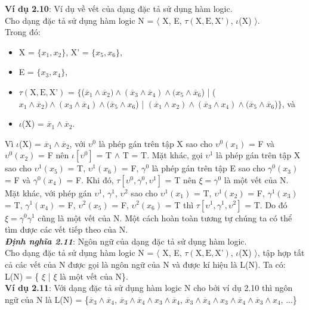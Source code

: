 \documentclass[a4paper,13pt,oneside,openany]{book}
\begin{document}
\begin{flushleft}
		\textbf{Ví dụ 2.10}: Ví dụ về vết của dạng đặc tả sử dụng hàm logic.\\
		Cho dạng đặc tả sử dụng hàm logic N = $\langle$ X, E, $\tau(\textrm{X}, \textrm{E}, \textrm{X'})$, $\iota$(X) $\rangle$.\\
		Trong đó:
		\begin{itemize}
			\item X = $\{x_1, x_2\}$, X' = $\{x_5, x_6\}$,
			\item E = $\{x_3, x_4\}$,
			\item $\tau(\textrm{X}, \textrm{E}, \textrm{X'})$ = $\{$($\overline{x}_1 \land \overline{x}_2) \land (\overline{x}_3 \land \overline{x}_4) \land (x_5 \land \overline{x}_6$) | ($x_1\land\overline{x}_2)\land (x_3\land \overline{x}_4)\land (\overline{x}_5 \land x_6$) | $(\overline{x}_1\land x_2)\land(\overline{x}_3\land x_4)\land (\overline{x}_5\land\overline{x}_6$)$\}$, và
			\item $\iota$(X) = $\overline{x}_1 \land \overline{x}_2$.
		\end{itemize}
		Vì $\iota$(X) = $\overline{x}_1 \land \overline{x}_2$, với $\upsilon^0$ là phép gán trên tập X sao cho $\upsilon^0(x_1)$ = F và $\upsilon^0(x_2)$ = F nên $\iota[\upsilon^0]$ = T $\land$ T = T. Mặt khác, gọi $\upsilon^1$ là phép gán trên tập X sao cho $\upsilon^1(x_5)$ = T, $\upsilon^1(x_6)$ = F, $\gamma^0$ là phép gán trên tập E sao cho $\gamma^0(x_3)$ = F và $\gamma^0(x_4)$ = F. Khi đó, $\tau[\upsilon^0, \gamma^0, \upsilon^1]$ = T nên $\xi = \gamma^0$ là một vết của N.
		Mặt khác, với phép gán $\upsilon^1$, $\gamma^1$,  $\upsilon^2$ sao cho $\upsilon^1(x_1)$ = T, $\upsilon^1(x_2)$ = F, $\gamma^1(x_3)$ = T, $\gamma^1(x_4)$ = F, $\upsilon^2(x_5)$ = F,  $\upsilon^2(x_6)$ = T thì $\tau[\upsilon^1, \gamma^1, \upsilon^2]$ = T. Do đó $\xi = \gamma^0\gamma^1$ cũng là một vết của N. Một cách hoàn toàn tương tự chúng ta có thể tìm được các vết tiếp theo của N.\\
		\textbf{\textit{Định nghĩa 2.11}}: Ngôn ngữ của dạng đặc tả sử dụng hàm logic.\\
		Cho dạng đặc tả sử dụng hàm logic N = $\langle$ X, E, $\tau(\textrm{X}, \textrm{E}, \textrm{X'})$, $\iota$(X) $\rangle$, tập hợp tất cả các vết của N được gọi là ngôn ngữ của N và được kí hiệu là L(N). Ta có: L(N) =  \{ $\xi$ | $\xi$ là một vết của N\}.\\
		\textbf{Ví dụ 2.11}: Với dạng đặc tả sử dụng hàm logic N cho bởi ví dụ 2.10 thì ngôn ngữ của N là L(N) = \{$\overline{x}_3 \land \overline{x}_4$, $\overline{x}_3 \land \overline{x}_4 \land x_3 \land \overline{x}_4$, $\overline{x}_3 \land \overline{x}_4 \land x_3 \land \overline{x}_4 \land \overline{x}_3 \land x_4$, ...\}

\end{flushleft}
\end{document}
